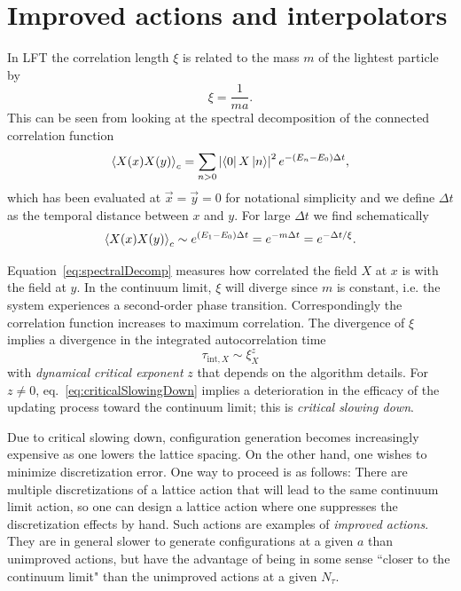 \chapter{Improved actions and interpolators}

In LFT the correlation length $\xi$ is related to the mass $m$ of the lightest 
particle by
\begin{equation}
  \xi=\frac{1}{ma}.
\end{equation}
This can be seen from looking at the spectral decomposition of the
connected correlation function
\begin{equation}\label{eq:spectralDecomp}
  \ev{X(x)X(y)}_c=\sum_{n> 0} 
                   \left|\bra{0}X\ket{n}\right|^2
                    e^{-(E_n-E_0)\Delta t},
\end{equation}
which has been evaluated at $\vec{x}=\vec{y}=0$ for notational simplicity and
we define $\Delta t$ as the temporal distance between $x$ and $y$.
For large $\Delta t$ we find schematically
\begin{equation}
  \ev{X(x)X(y)}_c\sim e^{(E_1-E_0)\Delta t} =e^{-m\Delta t}=e^{-\Delta t/\xi}.
\end{equation}

Equation~\eqref{eq:spectralDecomp} measures how correlated the field 
$X$ at $x$ is with the field at $y$. In the continuum limit, $\xi$ will 
diverge since $m$ is constant, i.e. the system experiences a second-order 
phase transition. Correspondingly the correlation function increases to
maximum correlation. The divergence of $\xi$ implies a divergence in the
integrated autocorrelation time
\begin{equation}\label{eq:criticalSlowingDown}
  \tau_{\text{int}, X} \sim \xi_X^z
\end{equation}
with {\it dynamical critical exponent} $z$ that depends on the algorithm 
details. For $z\neq 0$, eq.~\eqref{eq:criticalSlowingDown} implies a
deterioration in the efficacy of the updating process toward the
continuum limit; this is {\it critical slowing down}.

Due to critical slowing down, configuration generation becomes increasingly
expensive as one lowers the lattice spacing.
On the other hand, one wishes to minimize discretization error. One way to
proceed is as follows: There are multiple discretizations of a lattice action
that will lead to the same continuum limit action, so one can design a lattice
action where one suppresses the discretization effects by hand. Such actions
are examples of {\it improved actions}. They are in general slower to generate
configurations at a given $a$ than unimproved actions, but have the advantage
of being in some sense ``closer to the continuum limit" than the unimproved
actions at a given $N_\tau$.

